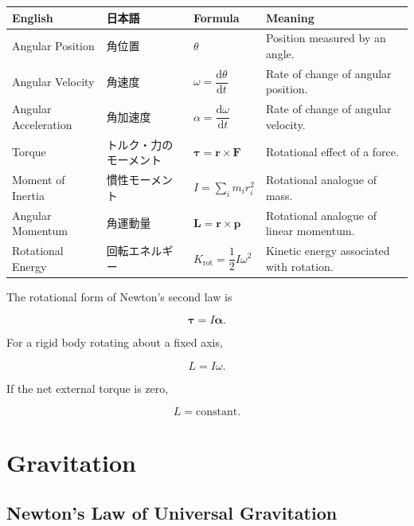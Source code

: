 \documentclass[11pt,a4paper]{article}
\newcommand{\dd}{\mathrm{d}}
\begin{document}
\begin{longtable}{p{} p{} p{} p{}}
\toprule
\textbf{English} & \textbf{日本語} & \textbf{Formula} & \textbf{Meaning} \\
\midrule
\endhead

Angular Position & 角位置 &
$\theta$ &
Position measured by an angle. \\

Angular Velocity & 角速度 &
$\omega=\dfrac{\dd\theta}{\dd t}$ &
Rate of change of angular position. \\

Angular Acceleration & 角加速度 &
$\alpha=\dfrac{\dd\omega}{\dd t}$ &
Rate of change of angular velocity. \\

Torque & トルク・力のモーメント &
$\bm{\tau}=\bm{r}\times\bm{F}$ &
Rotational effect of a force. \\

Moment of Inertia & 慣性モーメント &
$I=\sum_i m_ir_i^2$ &
Rotational analogue of mass. \\

Angular Momentum & 角運動量 &
$\bm{L}=\bm{r}\times\bm{p}$ &
Rotational analogue of linear momentum. \\

Rotational Energy & 回転エネルギー &
$K_{\mathrm{rot}}=\dfrac12I\omega^2$ &
Kinetic energy associated with rotation. \\

\bottomrule
\end{longtable}

The rotational form of Newton's second law is

\[
\bm{\tau}=I\bm{\alpha}.
\]

For a rigid body rotating about a fixed axis,

\[
L=I\omega.
\]

If the net external torque is zero,

\[
L=\text{constant}.
\]

\section{Gravitation}

\subsection{Newton's Law of Universal Gravitation}
\end{document}
